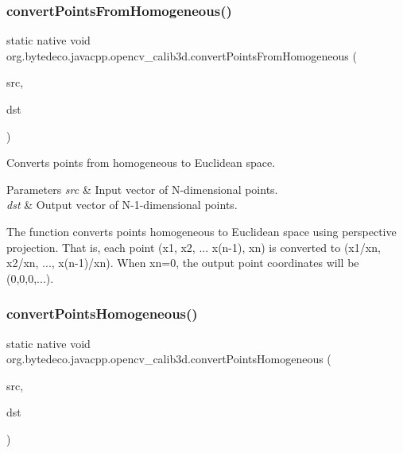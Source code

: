 \subsubsection{\texorpdfstring{convert\+Points\+From\+Homogeneous()}{convertPointsFromHomogeneous()}}
{\footnotesize\ttfamily static native void org.\+bytedeco.\+javacpp.\+opencv\+\_\+calib3d.\+convert\+Points\+From\+Homogeneous (\begin{DoxyParamCaption}\item[{@By\+Val Mat}]{src,  }\item[{@By\+Val Mat}]{dst }\end{DoxyParamCaption})\hspace{0.3cm}{\ttfamily [static]}}



Converts points from homogeneous to Euclidean space. 


\begin{DoxyParams}{Parameters}
{\em src} & Input vector of N-\/dimensional points. \\
\hline
{\em dst} & Output vector of N-\/1-\/dimensional points. \\
\hline
\end{DoxyParams}
The function converts points homogeneous to Euclidean space using perspective projection. That is, each point (x1, x2, ... x(n-\/1), xn) is converted to (x1/xn, x2/xn, ..., x(n-\/1)/xn). When xn=0, the output point coordinates will be (0,0,0,...). \mbox{\label{group__calib3d_gaaf02e05437bf63217e14cc47531a387b}} 
\subsubsection{\texorpdfstring{convert\+Points\+Homogeneous()}{convertPointsHomogeneous()}}
{\footnotesize\ttfamily static native void org.\+bytedeco.\+javacpp.\+opencv\+\_\+calib3d.\+convert\+Points\+Homogeneous (\begin{DoxyParamCaption}\item[{@By\+Val Mat}]{src,  }\item[{@By\+Val Mat}]{dst }\end{DoxyParamCaption})\hspace{0.3cm}{\ttfamily [static]}}



